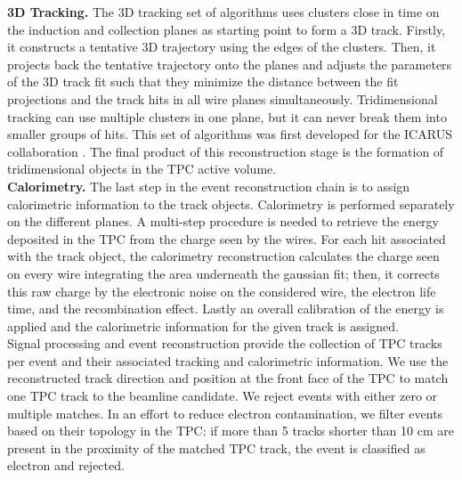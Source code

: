 \documentclass[aps,prl,twocolumn,showpacs,superscriptaddress,groupedaddress]{revtex4}  %
\begin{document}
\textbf{3D Tracking.} The 3D tracking set of algorithms uses clusters close in time on the induction and collection planes as starting point to form a 3D track. Firstly, it constructs a tentative 3D trajectory using the edges of the clusters. Then, it  projects back the tentative trajectory onto the planes and adjusts the parameters of the 3D track fit such that they minimize the distance between the fit projections and the track hits in all wire planes simultaneously.  Tridimensional tracking can use multiple clusters in one plane, but it can never break them into smaller groups of hits. This set of algorithms was first developed for the ICARUS collaboration \cite{Antonello2013}. The final product of this reconstruction stage is the formation of  tridimensional objects in the TPC active volume.\\%

\textbf{Calorimetry.} The last step in the event reconstruction chain is to assign calorimetric information to the track objects. Calorimetry is performed separately on the different planes. A multi-step procedure is needed to retrieve the energy deposited in the TPC  from the charge seen by the wires.
For each hit associated with the track object, the calorimetry reconstruction calculates the charge seen on every wire integrating the area underneath the gaussian fit; then, it corrects this raw charge by the electronic noise on the considered wire, the electron life time, and the recombination effect. Lastly an overall calibration of the energy is applied and the calorimetric information for the given track is assigned. \\

Signal processing and event reconstruction provide the collection of TPC tracks per event and their associated tracking and calorimetric information. We use the reconstructed track direction and position at the front face of the TPC to match one TPC track to the beamline candidate. We reject events with either zero or multiple matches. In an effort to reduce electron contamination, we filter events based on their topology in the TPC: if more than 5  tracks shorter than 10 cm are present in the proximity of the matched TPC track, the event is classified as electron and rejected. 
\end{document}
